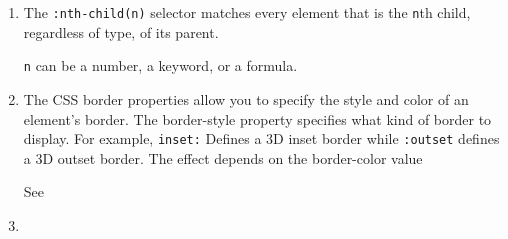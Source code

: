 \begin{enumerate}
\item 
{}
The \verb|:nth-child(n)| selector matches every element that is the \verb|n|th 
child, regardless of type, of its parent.

\verb|n| can be a number, a keyword, or a formula.

\item 

The CSS border properties allow you to specify the style and color of an element's border.
The border-style property specifies what kind of border to display.
For example, \verb|inset:| Defines a 3D inset border
while \verb|:outset| defines a 3D outset border. 
The effect depends on the border-color value

See 

\item 
\end{enumerate}




